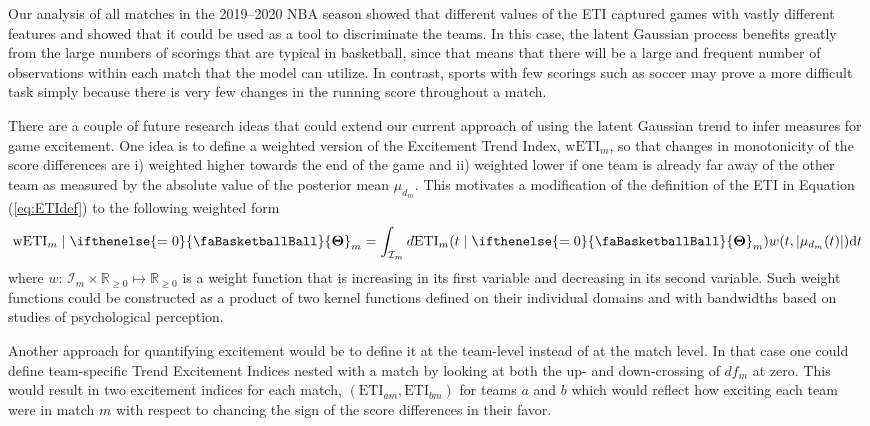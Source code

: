 \documentclass[
  11pt,
]{svjour3}
\theoremstyle{nonumberplain}
\begin{document}
Our analysis of all matches in the 2019--2020 NBA season showed that
different values of the ETI captured games with vastly different
features and showed that it could be used as a tool to discriminate the
teams. In this case, the latent Gaussian process benefits greatly from
the large numbers of scorings that are typical in basketball, since that
means that there will be a large and frequent number of observations
within each match that the model can utilize. In contrast, sports with
few scorings such as soccer may prove a more difficult task simply
because there is very few changes in the running score throughout a
match.

There are a couple of future research ideas that could extend our
current approach of using the latent Gaussian trend to infer measures
for game excitement. One idea is to define a weighted version of the
Excitement Trend Index, \(\mathrm{wETI}_m\), so that changes in
monotonicity of the score differences are i) weighted higher towards the
end of the game and ii) weighted lower if one team is already far away
of the other team as measured by the absolute value of the posterior
mean \(\mu_{d_m}\). This motivates a modification of the definition of
the ETI in Equation (\ref{eq:ETIdef}) to the following weighted form
\begin{align*}
  \mathrm{wETI}_m\mid \ifthenelse{\value{bbsym4theta}=0}{\text{\faBasketballBall}}{\mathbf{\Theta}}_m = \int_{\mathcal{I}_m} d\mathrm{ETI}_m(t \mid \ifthenelse{\value{bbsym4theta}=0}{\text{\faBasketballBall}}{\mathbf{\Theta}}_m)w(t, |\mu_{d_m}(t)|)\mathrm{d}t
\end{align*} where
\(w\colon\, \mathcal{I}_m \times \mathbb{R}_{\geq 0} \mapsto \mathbb{R}_{\geq 0}\)
is a weight function that is increasing in its first variable and
decreasing in its second variable. Such weight functions could be
constructed as a product of two kernel functions defined on their
individual domains and with bandwidths based on studies of psychological
perception.

Another approach for quantifying excitement would be to define it at the
team-level instead of at the match level. In that case one could define
team-specific Trend Excitement Indices nested with a match by looking at
both the up- and down-crossing of \(df_m\) at zero. This would result in
two excitement indices for each match,
\((\mathrm{ETI}_{am}, \mathrm{ETI}_{bm})\) for teams \(a\) and \(b\)
which would reflect how exciting each team were in match \(m\) with
respect to chancing the sign of the score differences in their favor.
\end{document}
